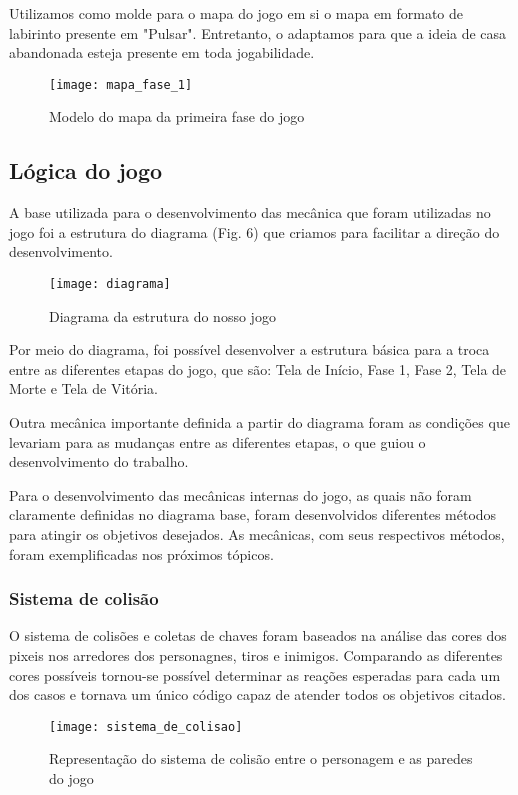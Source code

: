 \documentclass[conference]{IEEEtran}
\begin{document}
Utilizamos como molde para o mapa do jogo em si o mapa em formato de labirinto presente em "Pulsar". Entretanto, o adaptamos para que a ideia de casa abandonada esteja presente em toda jogabilidade.

\begin{figure}[H]
\centering
\texttt{[image: mapa\_fase\_1]}
\caption{Modelo do mapa da primeira fase do jogo}
\end{figure}  

\subsection{Lógica do jogo}

A base utilizada para o desenvolvimento das mecânica que foram utilizadas no jogo foi a estrutura do diagrama (Fig. 6) que criamos para facilitar a direção do desenvolvimento.

\begin{figure}[h]
\centering
\texttt{[image: diagrama]}
\caption{Diagrama da estrutura do nosso jogo}
\end{figure}

Por meio do diagrama, foi possível desenvolver a estrutura básica para a troca entre as diferentes etapas do jogo, que são: Tela de Início, Fase 1, Fase 2, Tela de Morte e Tela de Vitória.

Outra mecânica importante definida a partir do diagrama foram as condições que levariam para as mudanças entre as diferentes etapas, o que guiou o desenvolvimento do trabalho.

Para o desenvolvimento das mecânicas internas do jogo, as quais não foram claramente definidas no diagrama base, foram desenvolvidos diferentes métodos para atingir os objetivos desejados. As mecânicas, com seus respectivos métodos, foram exemplificadas nos próximos tópicos.

\subsubsection{Sistema de colisão}
 O sistema de colisões e coletas de chaves foram baseados na análise das cores dos pixeis nos arredores dos personagnes, tiros e inimigos. Comparando as diferentes cores possíveis tornou-se possível determinar as reações esperadas para cada um dos casos e tornava um único código capaz de atender todos os objetivos citados.

\begin{figure}[h]
\centering
\texttt{[image: sistema\_de\_colisao]}
\caption{Representação do sistema de colisão entre o personagem e as paredes do jogo}
\end{figure}  
\end{document}
